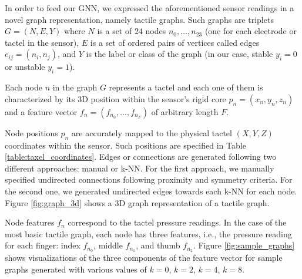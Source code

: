 In order to feed our \acl{GNN}, we expressed the aforementioned sensor readings in a novel graph representation, namely tactile graphs. Such graphs are triplets $G = (N, E, Y)$ where $N$ is a set of $24$ nodes ${n_0, ..., n_{23}}$ (one for each electrode or tactel in the sensor), $E$ is a set of ordered pairs of vertices called edges $e_{ij} = (n_i, n_j)$, and $Y$ is the label or class of the graph (in our case, stable $y_i = 0$ or unstable $y_i = 1$).

Each node $n$ in the graph $G$ represents a tactel and each one of them is characterized by its \acs{3D} position within the sensor's rigid core $p_n = (x_n, y_n, z_n)$ and a feature vector $f_n = (f_{n_0}, ..., f_{n_F})$ of arbitrary length $F$.

Node positions $p_n$ are accurately mapped to the physical tactel $(X, Y, Z)$ coordinates within the sensor. Such positions are specified in Table \ref{table:taxel_coordinates}. Edges or connections are generated following two different approaches: manual or \ac{k-NN}. For the first approach, we manually specified undirected connections following proximity and symmetry criteria. For the second one, we generated undirected edges towards each \acl{k-NN} for each node. Figure \ref{fig:graph_3d} shows a \acs{3D} graph representation of a tactile graph.

Node features $f_n$ correspond to the tactel pressure readings. In the case of the most basic tactile graph, each node has three features, i.e., the pressure reading for each finger: index $f_{n_0}$, middle $f_{n_1}$, and thumb $f_{n_2}$. Figure \ref{fig:sample_graphs} shows visualizations of the three components of the feature vector for sample graphs generated with various values of $k=0$, $k=2$, $k=4$, $k=8$.

